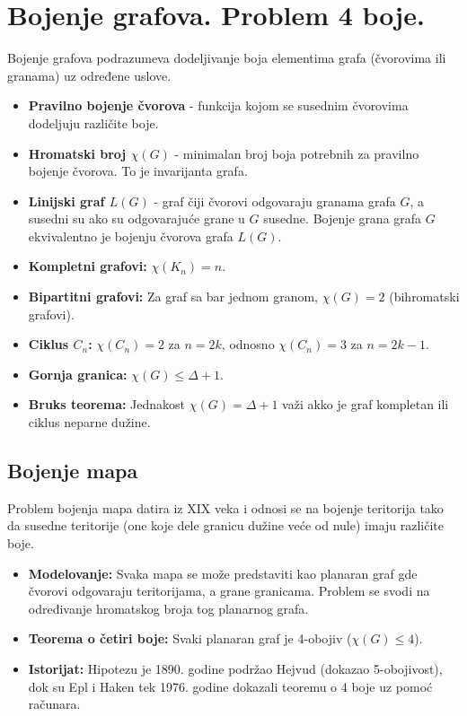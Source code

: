 \documentclass[a4paper,12pt]{article}
\numberwithin{algorithm}{section}
\theoremstyle{plain}
\theoremstyle{definition}
\theoremstyle{remark}
\begin{document}
\section{Bojenje grafova. Problem 4 boje.}
Bojenje grafova podrazumeva dodeljivanje boja elementima grafa (čvorovima ili granama) uz određene uslove.

\begin{itemize}
    \item \textbf{Pravilno bojenje čvorova} - funkcija kojom se susednim čvorovima dodeljuju različite boje.
    \item \textbf{Hromatski broj $\chi(G)$} - minimalan broj boja potrebnih za pravilno bojenje čvorova. To je invarijanta grafa.
    \item \textbf{Linijski graf $L(G)$} - graf čiji čvorovi odgovaraju granama grafa $G$, a susedni su ako su odgovarajuće grane u $G$ susedne. Bojenje grana grafa $G$ ekvivalentno je bojenju čvorova grafa $L(G)$.
\end{itemize}

\begin{itemize}
    \item \textbf{Kompletni grafovi:} $\chi(K_n) = n$.
    \item \textbf{Bipartitni grafovi:} Za graf sa bar jednom granom, $\chi(G) = 2$ (bihromatski grafovi).
    \item \textbf{Ciklus $C_n$:} $\chi(C_n) = 2$ za $n=2k$, odnosno $\chi(C_n) = 3$ za $n=2k-1$.
    \item \textbf{Gornja granica:} $\chi(G) \leq \Delta + 1$.
    \item \textbf{Bruks teorema:} Jednakost $\chi(G) = \Delta + 1$ važi akko je graf kompletan ili ciklus neparne dužine.
\end{itemize}

\subsection{Bojenje mapa}
Problem bojenja mapa datira iz XIX veka i odnosi se na bojenje teritorija tako da susedne teritorije (one koje dele granicu dužine veće od nule) imaju različite boje.

\begin{itemize}
    \item \textbf{Modelovanje:} Svaka mapa se može predstaviti kao planaran graf gde čvorovi odgovaraju teritorijama, a grane granicama. Problem se svodi na određivanje hromatskog broja tog planarnog grafa.
    \item \textbf{Teorema o četiri boje:} Svaki planaran graf je 4-obojiv ($\chi(G) \leq 4$).
    \item \textbf{Istorijat:} Hipotezu je 1890. godine podržao Hejvud (dokazao 5-obojivost), dok su Epl i Haken tek 1976. godine dokazali teoremu o 4 boje uz pomoć računara.
\end{itemize}
\end{document}

